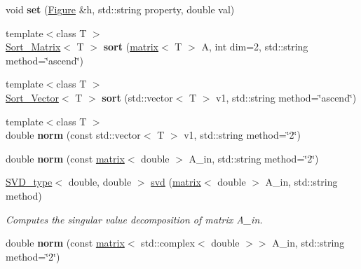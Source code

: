 \begin{DoxyCompactItemize}
\item 
\hypertarget{namespacekeycpp_afcd6ae07fc18f5374868fe314f00108c}{void {\bfseries set} (\hyperlink{classkeycpp_1_1_figure}{Figure} \&h, std\-::string property, double val)}\label{namespacekeycpp_afcd6ae07fc18f5374868fe314f00108c}

\item 
\hypertarget{namespacekeycpp_a6862448bf6e09309e60a6ba7aa0caf9a}{{\footnotesize template$<$class T $>$ }\\\hyperlink{structkeycpp_1_1_sort___matrix}{Sort\-\_\-\-Matrix}$<$ T $>$ {\bfseries sort} (\hyperlink{classkeycpp_1_1matrix}{matrix}$<$ T $>$ A, int dim=2, std\-::string method=\char`\"{}ascend\char`\"{})}\label{namespacekeycpp_a6862448bf6e09309e60a6ba7aa0caf9a}

\item 
\hypertarget{namespacekeycpp_a1be4e97b99a996a01f428fd8ba048fb0}{{\footnotesize template$<$class T $>$ }\\\hyperlink{structkeycpp_1_1_sort___vector}{Sort\-\_\-\-Vector}$<$ T $>$ {\bfseries sort} (std\-::vector$<$ T $>$ v1, std\-::string method=\char`\"{}ascend\char`\"{})}\label{namespacekeycpp_a1be4e97b99a996a01f428fd8ba048fb0}

\item 
\hypertarget{namespacekeycpp_aa01035a2b2a07cd56c5e36d5f289b2ee}{{\footnotesize template$<$class T $>$ }\\double {\bfseries norm} (const std\-::vector$<$ T $>$ v1, std\-::string method=\char`\"{}2\char`\"{})}\label{namespacekeycpp_aa01035a2b2a07cd56c5e36d5f289b2ee}

\item 
\hypertarget{namespacekeycpp_a7e5236252f6a33f3523fb805a2d1727c}{double {\bfseries norm} (const \hyperlink{classkeycpp_1_1matrix}{matrix}$<$ double $>$ A\-\_\-in, std\-::string method=\char`\"{}2\char`\"{})}\label{namespacekeycpp_a7e5236252f6a33f3523fb805a2d1727c}

\item 
\hypertarget{namespacekeycpp_a4b80bd145aab03a9e79a42d32ca573bd}{\hyperlink{structkeycpp_1_1_s_v_d__type}{S\-V\-D\-\_\-type}$<$ double, double $>$ \hyperlink{namespacekeycpp_a4b80bd145aab03a9e79a42d32ca573bd}{svd} (\hyperlink{classkeycpp_1_1matrix}{matrix}$<$ double $>$ A\-\_\-in, std\-::string method)}\label{namespacekeycpp_a4b80bd145aab03a9e79a42d32ca573bd}

\begin{DoxyCompactList}\small\item\em Computes the singular value decomposition of matrix A\-\_\-in. \end{DoxyCompactList}\item 
\hypertarget{namespacekeycpp_a867ba604b4e72e41b123f890dd66d854}{double {\bfseries norm} (const \hyperlink{classkeycpp_1_1matrix}{matrix}$<$ std\-::complex$<$ double $>$$>$ A\-\_\-in, std\-::string method=\char`\"{}2\char`\"{})}\label{namespacekeycpp_a867ba604b4e72e41b123f890dd66d854}


\end{DoxyCompactItemize}
